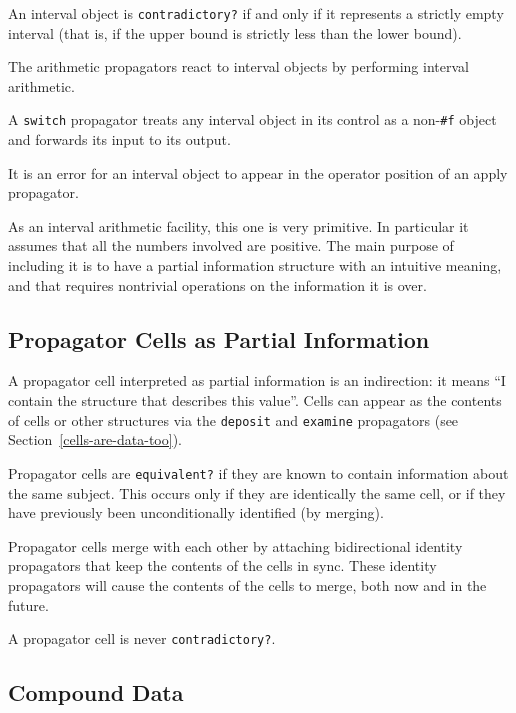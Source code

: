 \documentclass[12pt,letterpaper,english]{article}
\begin{document}
An interval object is \texttt{contradictory?} if and only if it represents
a strictly empty interval (that is, if the upper bound is strictly
less than the lower bound).

The arithmetic propagators react to interval objects by performing
interval arithmetic.

A \texttt{switch} propagator treats any interval object in its control as a
non-\texttt{{\#}f} object and forwards its input to its output.

It is an error for an interval object to appear in the operator
position of an apply propagator.

As an interval arithmetic facility, this one is very primitive.  In
particular it assumes that all the numbers involved are positive.  The
main purpose of including it is to have a partial information
structure with an intuitive meaning, and that requires nontrivial
operations on the information it is over.



\subsection{Propagator Cells as Partial Information}
\label{propagator-cells-as-partial-information}

A propagator cell interpreted as partial information is an
indirection: it means ``I contain the structure that describes this
value''.  Cells can appear as the contents of cells or other structures
via the \texttt{deposit} and \texttt{examine} propagators
(see Section~\ref{cells-are-data-too}).

Propagator cells are \texttt{equivalent?} if they are known to contain
information about the same subject.  This occurs only if they are
identically the same cell, or if they have previously been
unconditionally identified (by merging).

Propagator cells merge with each other by attaching bidirectional
identity propagators that keep the contents of the cells in sync.
These identity propagators will cause the contents of the cells to
merge, both now and in the future.

A propagator cell is never \texttt{contradictory?}.



\subsection{Compound Data}
\label{id1}
\end{document}

